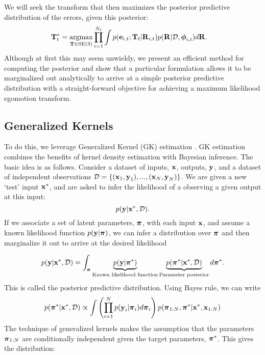 We will seek the transform that then maximizes the posterior predictive distribution of the errors, given this posterior:
\begin{align}
\label{eq:probe_vo_objective}
  \boldsymbol{\mathbf{T}}_t^* &=  \operatorname*{argmax}_{\boldsymbol{\mathbf{T}}\in\text{SE}(3)} \prod_{i=1}^{N_t} \int p(\boldsymbol{\mathbf{e}}_{i,t}; \boldsymbol{\mathbf{T}}_t |  \boldsymbol{\mathbf{R}}_{i,t}) p(\boldsymbol{\mathbf{R}}|\mathcal{D}, \boldsymbol{\mathbf{\phi}}_{i,t}) d\boldsymbol{\mathbf{R}}.
\end{align}
Although at first this may seem unwieldy, we present an efficient method for computing the posterior and show that a particular formulation allows it to be marginalized out analytically to arrive at a simple posterior predictive distribution with a straight-forward objective for achieving a maximum likelihood egomotion transform.
\subsection{Generalized Kernels}
To do this, we leverage Generalized Kernel (GK) estimation \citep{Vega-Brown2014-sb}. GK estimation combines the benefits of kernel density estimation with Bayesian inference. The basic idea is as follows. 
Consider a dataset of inputs, $\boldsymbol{\mathbf{x}}$, outputs, $\boldsymbol{\mathbf{y}}$,  and a dataset of independent observations $\mathcal{D} = \{(\boldsymbol{\mathbf{x}}_1, \boldsymbol{\mathbf{y}}_1), ..., (\boldsymbol{\mathbf{x}}_N, \boldsymbol{\mathbf{y}}_N) \}$. We are given a new `test' input $\boldsymbol{\mathbf{x}}^*$, and are asked to infer the likelihood of a observing a given output at this input:
\begin{equation}
p(\boldsymbol{\mathbf{y}} | 	\boldsymbol{\mathbf{x}}^*, \mathcal{D}).
\end{equation}
 If we associate a set of latent parameters, $\boldsymbol{\mathbf{\pi}}$, with each input $\boldsymbol{\mathbf{x}}$, and assume a known likelihood function $p(\boldsymbol{\mathbf{y}}|\boldsymbol{\mathbf{\pi}})$, we can infer a distribution over $\boldsymbol{\mathbf{\pi}}$ and then marginalize it out to arrive at the desired likelihood

\begin{equation}
p(\boldsymbol{\mathbf{y}} | 	\boldsymbol{\mathbf{x}}^*, \mathcal{D}) = \int_{\boldsymbol{\mathbf{\pi}}} \underbrace{p(\boldsymbol{\mathbf{y}} | \boldsymbol{\mathbf{\pi}}^*)}_{\text{Known likelihood function}} \underbrace{p(\boldsymbol{\mathbf{\pi}}^* | \boldsymbol{\mathbf{x}}^*, \mathcal{D})}_{\text{Parameter posterior}} d\boldsymbol{\mathbf{\pi}}^*.
\end{equation}
This is called the posterior predictive distribution. Using Bayes rule, we can write
\begin{equation}
\label{eq:probe_posterior_bayes_rule}
p(\boldsymbol{\mathbf{\pi}}^* | \boldsymbol{\mathbf{x}}^*, \mathcal{D}) \propto \int \left( \prod_{i=1}^N p(\boldsymbol{\mathbf{y}}_i | \boldsymbol{\mathbf{\pi}}_i)d\boldsymbol{\mathbf{\pi}}_i \right) p(\boldsymbol{\mathbf{\pi}}_{1:N}, \boldsymbol{\mathbf{\pi}}^*| \boldsymbol{\mathbf{x}}^*, \boldsymbol{\mathbf{x}}_{1:N})
\end{equation}
The technique of generalized kernels makes the assumption that the parameters $\boldsymbol{\mathbf{\pi}}_{1:N}$ are conditionally independent given the target parameters, $\boldsymbol{\mathbf{\pi}}^*$. This gives the distribution:

